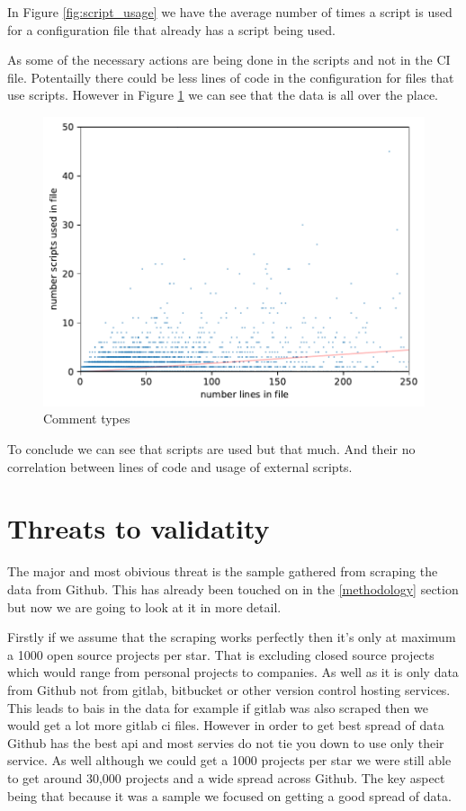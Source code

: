 \documentclass[twoside,12pt,titlepage,a4paper]{article}
\begin{document}
In Figure \ref{fig:script_usage} we have the average number of times a script is used for a configuration file that already has a script being used.

As some of the necessary actions are being done in the scripts and not in the CI file. Potentailly there could be less lines of code in the configuration for files that use scripts. However in Figure \ref{fig:script_scatter_lines} we can see that the data is all over the place.

\begin{figure}[!h]
  \includegraphics[width=\textwidth]{../src/results/scripts vs lines.pdf}
  \caption[alt text]{Comment types}
  \label{fig:script_scatter_lines}  
\end{figure}

To conclude we can see that scripts are used but that much. And their no correlation between lines of code and usage of external scripts.


\pagebreak

\section{Threats to validatity}

The major and most obivious threat is the sample gathered from scraping the data from Github. This has already been touched on in the \ref{methodology} section but now we are going to look at it in more detail.

Firstly if we assume that the scraping works perfectly then it's only at maximum a 1000 open source projects per star. That is excluding closed source projects which would range from personal projects to companies. As well as it is only data from Github not from gitlab, bitbucket or other version control hosting services. This leads to bais in the data for example if gitlab was also scraped then we would get a lot more gitlab ci files. However in order to get best spread of data Github has the best api and most servies do not tie you down to use only their service. As well although we could get a 1000 projects per star we were still able to get around 30,000 projects and a wide spread across Github. The key aspect being that because it was a sample we focused on getting a good spread of data.
\end{document}
